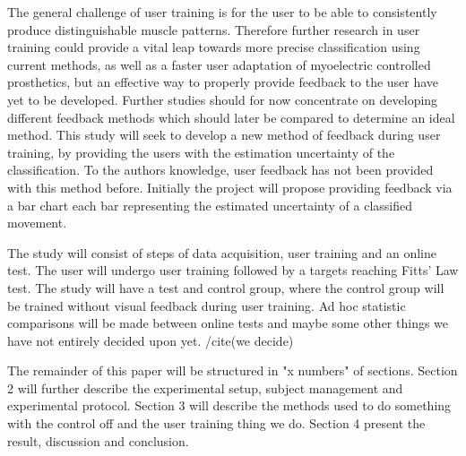 The general challenge of user training is for the user to be able to consistently produce distinguishable muscle patterns. \cite{Powell2014} Therefore further research in user training could provide a vital leap towards more precise classification using current methods, as well as a faster user adaptation of myoelectric controlled prosthetics, but an effective way to properly provide feedback to the user have yet to be developed. 
Further studies should for now concentrate on developing different feedback methods which should later be compared to determine an ideal method. 
This study will seek to develop a new method of feedback during user training, by providing the users with the estimation uncertainty of the classification. To the authors knowledge, user feedback has not been provided with this method before. Initially the project will propose providing feedback via a bar chart each bar representing the estimated uncertainty of a classified movement. 


The study will consist of steps of data acquisition, user training and an online test. The user will undergo user training followed by a targets reaching Fitts' Law test. The study will have a test and control group, where the control group will be trained without visual feedback during user training. Ad hoc statistic comparisons will be made between online tests and maybe some other things we have not entirely decided upon yet. /cite(we decide)


The remainder of this paper will be structured in "x numbers" of sections. Section 2 will further describe the experimental setup, subject management and experimental protocol. Section 3 will describe the methods used to do something with the control off and the user training thing we do. Section 4 present the result, discussion and conclusion. 


